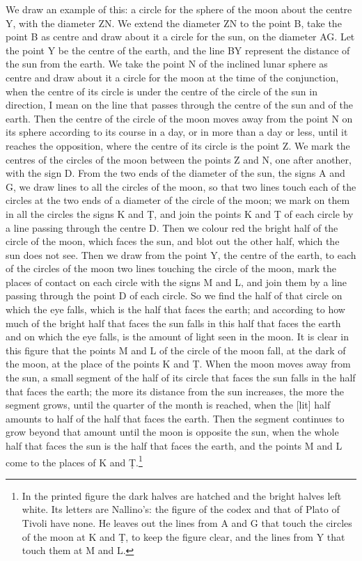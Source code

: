 \documentclass[11pt]{article}
\newcommand{\ArPage}[1]{\marginpar{\footnotesize\color{gray}Ar.\,p.\,#1}}
\begin{document}
\par \ArPage{93}We draw an example of this: a circle for the sphere of the moon about the centre Y, with the diameter ZN. We extend the diameter ZN to the point B, take the point B as centre and draw about it a circle for the sun, on the diameter AG. Let the point Y be the centre of the earth, and the line BY represent the distance of the sun from the earth. We take the point N of the inclined lunar sphere as centre and draw about it a circle for the moon at the time of the conjunction, when the centre of its circle is under the centre of the circle of the sun in direction, I mean on the line that passes through the centre of the sun and of the earth. Then the centre of the circle of the moon moves away from the point N on its sphere according to its course in a day, or in more than a day or less, until it reaches the opposition, where the centre of its circle is the point Z. We mark the centres of the circles of the moon between the points Z and N, one after another, with the sign D. From the two ends of the diameter of the sun, the signs A and G, we draw lines to all the circles of the moon, so that two lines touch each of the circles at the two ends of a diameter of the circle of the moon; we mark on them in all the circles the signs K and Ṭ, and join the points K and Ṭ of each circle by a line passing through the centre D. Then we colour red the bright half of the circle of the moon, which faces the sun, and blot out the other half, which the sun does not see. Then we draw from the point Y, the centre of the earth, to each of the circles of the moon two lines touching the circle of the moon, mark the places of contact on each circle with the signs M and L, and join them by a line passing through the point D of each circle. So we find the half of that circle on which the eye falls, which is the half that faces the earth; and according to how much of the bright half that faces the sun falls in this half that faces the earth and on which the eye falls, is the amount of light seen in the moon. It is clear in this figure that the points M and L of the circle of the moon fall, at the dark of the moon, at the place of the points K and Ṭ. When the moon moves away from the sun, a small segment of the half of its circle that faces the sun falls in the half that faces the earth; the more its distance from the sun increases, the more the segment grows, until the quarter of the month is reached, when the [lit] half amounts to half of the half that faces the earth. Then the segment continues to grow beyond that amount until the moon is opposite the sun, when the whole half that faces the sun is the half that faces the earth, and the points M and L come to the places of K and Ṭ.\footnote{In the printed figure the dark halves are hatched and the bright halves left white. Its letters are Nallino's: the figure of the codex and that of Plato of Tivoli have none. He leaves out the lines from A and G that touch the circles of the moon at K and Ṭ, to keep the figure clear, and the lines from Y that touch them at M and L.}\par
\end{document}
